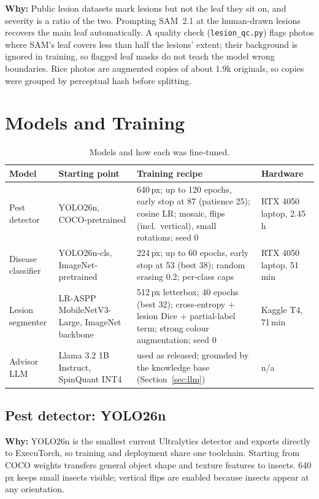 \documentclass[11pt,a4paper]{article}
\newcommand{\why}[1]{\par\smallskip\noindent\colorbox{leaflight}{\parbox{\dimexpr\linewidth-2\fboxsep}{\small\textbf{\color{leaf}Why:} #1}}\par\smallskip}
\begin{document}
\why{Public lesion datasets mark lesions but not the leaf they sit on, and severity is a ratio of the two. Prompting
SAM~2.1 at the human-drawn lesions recovers the main leaf automatically. A quality check
(\texttt{lesion\_qc.py}) flags photos where SAM's leaf covers less than half the lesions' extent; their background is
ignored in training, so flagged leaf masks do not teach the model wrong boundaries. Rice photos are augmented copies of
about 1.9k originals, so copies were grouped by perceptual hash before splitting.}

\section{Models and Training}

\begin{table}[h]
\centering\small
\begin{tabularx}{\linewidth}{@{}p{2.5cm}p{3.2cm}L p{2.2cm}@{}}
\toprule
\textbf{Model} & \textbf{Starting point} & \textbf{Training recipe} & \textbf{Hardware} \\
\midrule
Pest detector & YOLO26n, COCO-pretrained & 640\,px; up to 120 epochs, early stop at 87 (patience 25); cosine LR; mosaic, flips (incl.\ vertical), small rotations; seed 0 & RTX 4050 laptop, 2.45\,h \\
Disease classifier & YOLO26n-cls, ImageNet-pretrained & 224\,px; up to 60 epochs, early stop at 53 (best 38); random erasing 0.2; per-class caps & RTX 4050 laptop, 51\,min \\
Lesion segmenter & LR-ASPP MobileNetV3-Large, ImageNet backbone & 512\,px letterbox; 40 epochs (best 32); cross-entropy + lesion Dice + partial-label term; strong colour augmentation; seed 0 & Kaggle T4, 71\,min \\
Advisor LLM & Llama 3.2 1B Instruct, SpinQuant INT4 & used as released; grounded by the knowledge base (Section~\ref{sec:llm}) & n/a \\
\bottomrule
\end{tabularx}
\caption{Models and how each was fine-tuned.}
\end{table}

\subsection{Pest detector: YOLO26n}
\why{YOLO26n is the smallest current Ultralytics detector and exports directly to ExecuTorch, so training and
deployment share one toolchain. Starting from COCO weights transfers general object shape and texture features to
insects. 640\,px keeps small insects visible; vertical flips are enabled because insects appear at any orientation.}
\end{document}
